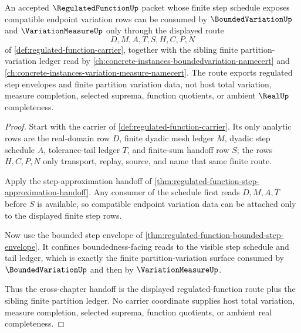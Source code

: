 \begin{theorem}
\label{thm:regulated-function-variation-control-route}
An accepted $\RegulatedFunctionUp$ packet whose finite step schedule exposes compatible endpoint variation rows can be consumed by $\BoundedVariationUp$ and $\VariationMeasureUp$ only through the displayed route
$$
D,M,A,T,S,H,C,P,N
$$
of \autoref{def:regulated-function-carrier}, together with the sibling finite partition-variation ledger read by \autoref{ch:concrete-instances-boundedvariation-namecert} and \autoref{ch:concrete-instances-variation-measure-namecert}. The route exports regulated step envelopes and finite partition variation data, not host total variation, measure completion, selected suprema, function quotients, or ambient $\RealUp$ completeness.
\end{theorem}
\begin{proof}
Start with the carrier of \autoref{def:regulated-function-carrier}. Its only analytic rows are the real-domain row $D$, finite dyadic mesh ledger $M$, dyadic step schedule $A$, tolerance-tail ledger $T$, and finite-sum handoff row $S$; the rows $H,C,P,N$ only transport, replay, source, and name that same finite route.

Apply the step-approximation handoff of \autoref{thm:regulated-function-step-approximation-handoff}. Any consumer of the schedule first reads $D,M,A,T$ before $S$ is available, so compatible endpoint variation data can be attached only to the displayed finite step rows.

Now use the bounded step envelope of \autoref{thm:regulated-function-bounded-step-envelope}. It confines boundedness-facing reads to the visible step schedule and tail ledger, which is exactly the finite partition-variation surface consumed by $\BoundedVariationUp$ and then by $\VariationMeasureUp$.

Thus the cross-chapter handoff is the displayed regulated-function route plus the sibling finite partition ledger. No carrier coordinate supplies host total variation, measure completion, selected suprema, function quotients, or ambient real completeness.
\end{proof}

